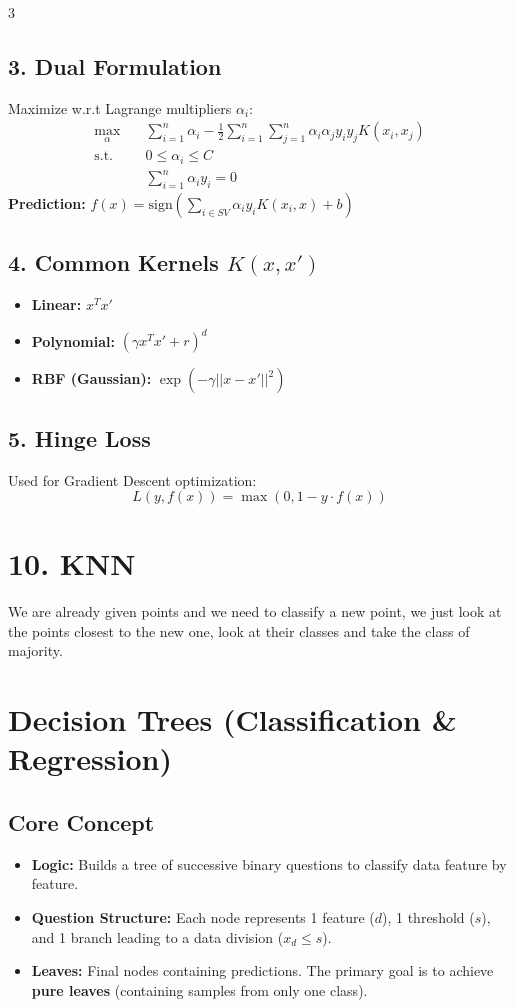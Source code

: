 \documentclass[10pt, a4paper, landscape]{article}
\begin{document}
\begin{multicols*}{3}
\subsection*{3. Dual Formulation}
Maximize w.r.t Lagrange multipliers $\alpha_i$:
\begin{align*}
    \max_{\alpha} \quad & \sum_{i=1}^n \alpha_i - \frac{1}{2} \sum_{i=1}^n \sum_{j=1}^n \alpha_i \alpha_j y_i y_j K(x_i, x_j) \\
    \text{s.t.} \quad & 0 \le \alpha_i \le C \\
                      & \sum_{i=1}^n \alpha_i y_i = 0
\end{align*}
\textbf{Prediction:} $f(x) = \text{sign}(\sum_{i \in SV} \alpha_i y_i K(x_i, x) + b)$

\subsection*{4. Common Kernels $K(x, x')$}
\begin{itemize}
    \item \textbf{Linear:} $x^T x'$
    \item \textbf{Polynomial:} $(\gamma x^T x' + r)^d$
    \item \textbf{RBF (Gaussian):} $\exp(-\gamma ||x - x'||^2)$
\end{itemize}

\subsection*{5. Hinge Loss}
Used for Gradient Descent optimization:
$$ L(y, f(x)) = \max(0, 1 - y \cdot f(x)) $$

\section{10. KNN}
We are already given points and we need to classify a new point, we just look
at the points closest to the new one, look at their classes and take the class
of majority.

\section*{Decision Trees (Classification \& Regression)}

\subsection*{Core Concept}
\begin{itemize}
    \item \textbf{Logic:} Builds a tree of successive binary questions to classify data feature by feature.
    \item \textbf{Question Structure:} Each node represents 1 feature ($d$), 1 threshold ($s$), and 1 branch leading to a data division ($x_d \le s$).
    \item \textbf{Leaves:} Final nodes containing predictions. The primary goal is to achieve \textbf{pure leaves} (containing samples from only one class).
\end{itemize}


\end{multicols*}
\end{document}
